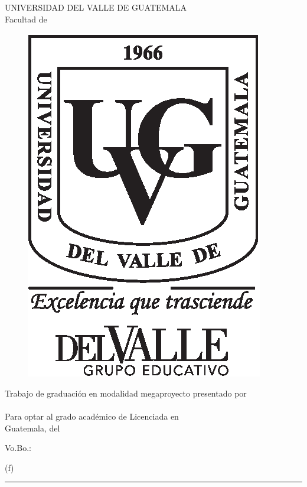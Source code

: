 \documentclass[10pt, letterpaper]{report}
\begin{document}
\ifdefined\CAPcaratula
	\newpage
	\pagecolor{white}
	\color{black}
	\setcounter{page}{1}
	\thispagestyle{empty}
	\begin{center}
		\LARGE UNIVERSIDAD DEL VALLE DE GUATEMALA\\
		\LARGE Facultad de \uvgfacultad \\[0.75cm]
	\end{center}
	\begin{figure}[h]
		\begin{center}
		\includegraphics[height=5.5 cm]{plantilla/escudoUVGnegro.eps}
		\vspace{0.5in}
		\end{center}
	\end{figure}
	\begin{center}
		\LARGE \textbf{\titulotesis} 
		\vfill
		\vfill
		\Large Trabajo de graduación en modalidad megaproyecto presentado por \\
		\Large \nombreestudiante \\
		\Large Para optar al grado académico de Licenciada en \uvgcarrera \\
		\vfill
		\large Guatemala, \mesentrega del \anoentrega
	\end{center}
\fi

\ifdefined\CAPfirmas
	\newpage
	\thispagestyle{empty}
	\vspace*{0.5in}
	\large Vo.Bo.:\\[1cm]
	\begin{center}
		(f) \rule[1pt]{4 in}{1pt}\\
		\nombreasesor
	\end{center}
	\vspace{1in}
\end{document}
